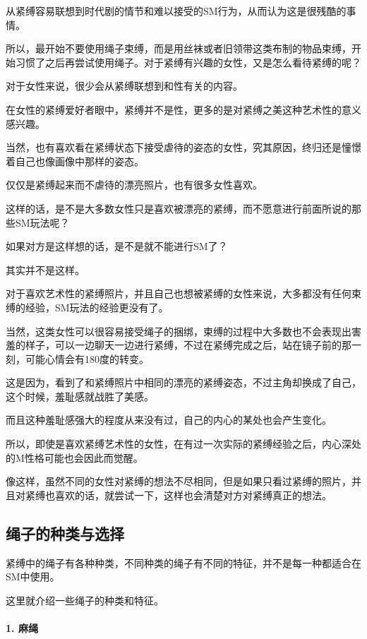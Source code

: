 \documentclass[12pt,UTF8]{ctexbook}
\begin{document}
从紧缚容易联想到时代剧的情节和难以接受的SM行为，从而认为这是很残酷的事情。

所以，最开始不要使用绳子束缚，而是用丝袜或者旧领带这类布制的物品束缚，开始习惯了之后再尝试使用绳子。对于紧缚有兴趣的女性，又是怎么看待紧缚的呢？

对于女性来说，很少会从紧缚联想到和性有关的内容。

在女性的紧缚爱好者眼中，紧缚并不是性，更多的是对紧缚之美这种艺术性的意义感兴趣。

当然，也有喜欢看在紧缚状态下接受虐待的姿态的女性，究其原因，终归还是憧憬着自己也像画像中那样的姿态。

仅仅是紧缚起来而不虐待的漂亮照片，也有很多女性喜欢。

这样的话，是不是大多数女性只是喜欢被漂亮的紧缚，而不愿意进行前面所说的那些SM玩法呢？

如果对方是这样想的话，是不是就不能进行SM了？

其实并不是这样。

对于喜欢艺术性的紧缚照片，并且自己也想被紧缚的女性来说，大多都没有任何束缚的经验，SM玩法的经验更没有了。

当然，这类女性可以很容易接受绳子的捆绑，束缚的过程中大多数也不会表现出害羞的样子，可以一边聊天一边进行紧缚，不过在紧缚完成之后，站在镜子前的那一刻，可能心情会有180度的转变。

这是因为，看到了和紧缚照片中相同的漂亮的紧缚姿态，不过主角却换成了自己，这个时候，羞耻感就战胜了美感。

而且这种羞耻感强大的程度从来没有过，自己的内心的某处也会产生变化。

所以，即使是喜欢紧缚艺术性的女性，在有过一次实际的紧缚经验之后，内心深处的M性格可能也会因此而觉醒。

像这样，虽然不同的女性对紧缚的想法不尽相同，但是如果只看过紧缚的照片，并且对紧缚也喜欢的话，就尝试一下，这样也会清楚对方对紧缚真正的想法。

\subsection{绳子的种类与选择}

紧缚中的绳子有各种种类，不同种类的绳子有不同的特征，并不是每一种都适合在SM中使用。

这里就介绍一些绳子的种类和特征。

\paragraph{1. 麻绳}
\end{document}

